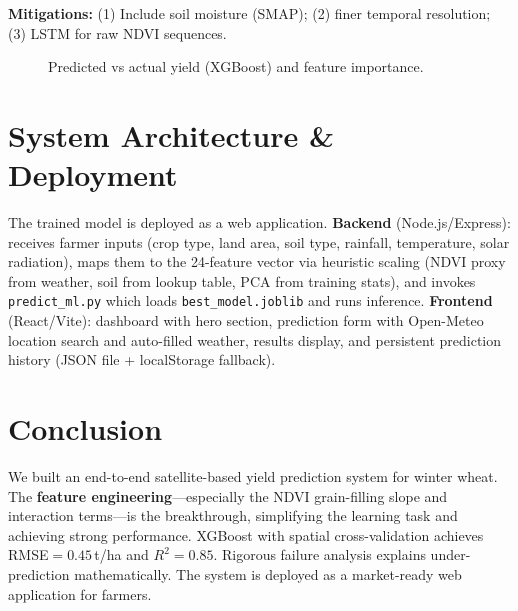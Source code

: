 \documentclass[conference]{IEEEtran}
\begin{document}
\textbf{Mitigations:} (1) Include soil moisture (SMAP); (2) finer temporal resolution; (3) LSTM for raw NDVI sequences.

\begin{figure}[t]
  \centering
  \caption{Predicted vs actual yield (XGBoost) and feature importance.}
  \label{fig:results}
\end{figure}

\section{System Architecture \& Deployment}
\label{sec:deploy}

The trained model is deployed as a web application. \textbf{Backend} (Node.js/Express): receives farmer inputs (crop type, land area, soil type, rainfall, temperature, solar radiation), maps them to the 24-feature vector via heuristic scaling (NDVI proxy from weather, soil from lookup table, PCA from training stats), and invokes \texttt{predict\_ml.py} which loads \texttt{best\_model.joblib} and runs inference. \textbf{Frontend} (React/Vite): dashboard with hero section, prediction form with Open-Meteo location search and auto-filled weather, results display, and persistent prediction history (JSON file + localStorage fallback).

\section{Conclusion}
\label{sec:conclusion}

We built an end-to-end satellite-based yield prediction system for winter wheat. The \textbf{feature engineering}---especially the NDVI grain-filling slope and interaction terms---is the breakthrough, simplifying the learning task and achieving strong performance. XGBoost with spatial cross-validation achieves RMSE$=0.45$\,t/ha and $R^2=0.85$. Rigorous failure analysis explains under-prediction mathematically. The system is deployed as a market-ready web application for farmers.
\end{document}
